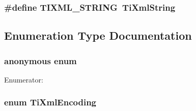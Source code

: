 \subsubsection{\setlength{\rightskip}{0pt plus 5cm}\#define TIXML\_\-STRING~{\bf TiXmlString}}\label{tinyxml_8h_92bada05fd84d9a0c9a5bbe53de26887}




\subsection{Enumeration Type Documentation}
\subsubsection{\setlength{\rightskip}{0pt plus 5cm}anonymous enum}\label{tinyxml_8h_06fc87d81c62e9abb8790b6e5713c55b}


\begin{Desc}
\item[Enumerator: ]\par
\begin{description}
\item[{\em 
TIXML\_\-SUCCESS\label{tinyxml_8h_06fc87d81c62e9abb8790b6e5713c55ba3e89edb94c177db48c4e29f92d737d9}
}]\item[{\em 
TIXML\_\-NO\_\-ATTRIBUTE\label{tinyxml_8h_06fc87d81c62e9abb8790b6e5713c55bb5d83b77941b021a657f1223e40dc28d}
}]\item[{\em 
TIXML\_\-WRONG\_\-TYPE\label{tinyxml_8h_06fc87d81c62e9abb8790b6e5713c55b4444723f0e0f7ba0bc120b172120d479}
}]\end{description}
\end{Desc}

\subsubsection{\setlength{\rightskip}{0pt plus 5cm}enum {\bf TiXmlEncoding}}\label{tinyxml_8h_88d51847a13ee0f4b4d320d03d2c4d96}


